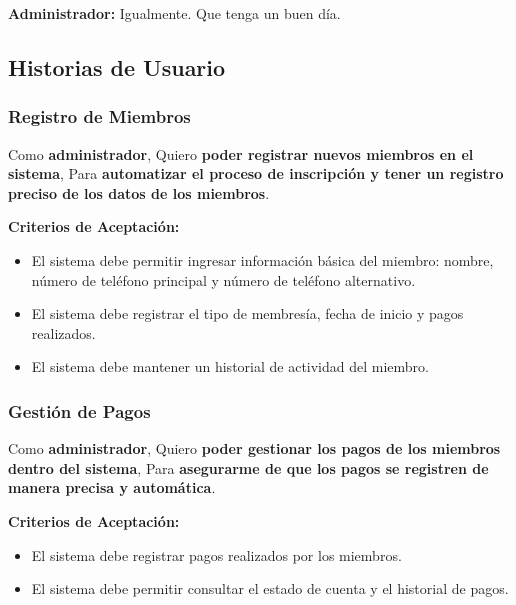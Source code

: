 \documentclass[spanish, 12pt]{article}
\providecommand{\tightlist}{\setlength{\itemsep}{0pt}
\setlength{\parskip}{0pt}}
\begin{document}
	\textbf{Administrador:} Igualmente. Que tenga un buen día.

	\subsection{Historias de Usuario}
	\label{historias-de-usuario}

	\subsubsection{Registro de Miembros}
	\label{registro-de-miembros-1}

	Como \textbf{administrador}, Quiero \textbf{poder registrar nuevos miembros en
	el sistema}, Para \textbf{automatizar el proceso de inscripción y tener un
	registro preciso de los datos de los miembros}.

	\textbf{Criterios de Aceptación:}

	\begin{itemize}
		\tightlist

		\item El sistema debe permitir ingresar información básica del miembro:
			nombre, número de teléfono principal y número de teléfono alternativo.

		\item El sistema debe registrar el tipo de membresía, fecha de inicio y
			pagos realizados.

		\item El sistema debe mantener un historial de actividad del miembro.
	\end{itemize}

	\subsubsection{Gestión de Pagos}
	\label{gestiuxf3n-de-pagos}

	Como \textbf{administrador}, Quiero \textbf{poder gestionar los pagos de los
	miembros dentro del sistema}, Para \textbf{asegurarme de que los pagos se
	registren de manera precisa y automática}.

	\textbf{Criterios de Aceptación:}

	\begin{itemize}
		\tightlist

		\item El sistema debe registrar pagos realizados por los miembros.

		\item El sistema debe permitir consultar el estado de cuenta y el historial de
			pagos.
	\end{itemize}
\end{document}
